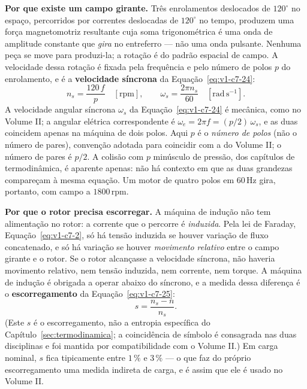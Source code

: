 \documentclass[12pt,a4paper]{article}
\numberwithin{equation}{section}
\numberwithin{table}{section}
\numberwithin{figure}{section}
\begin{document}
\textbf{Por que existe um campo girante.} Três enrolamentos deslocados de
$120^{\circ}$ no espaço, percorridos por correntes deslocadas de $120^{\circ}$
no tempo, produzem uma força magnetomotriz resultante cuja soma trigonométrica
é uma onda de amplitude constante que \emph{gira} no entreferro --- não uma
onda pulsante. Nenhuma peça se move para produzi-la; a rotação é do padrão
espacial de campo. A velocidade dessa rotação é fixada pela frequência e pelo
número de polos $p$ do enrolamento, e é a \textbf{velocidade síncrona} da
Equação~\eqref{eq:v1-c7-24}:
\begin{equation}\label{eq:v1-c7-24}
n_s = \frac{120\,f}{p} \quad [\mathrm{rpm}],
\qquad
\omega_s = \frac{2\pi n_s}{60} \quad [\mathrm{rad\,s^{-1}}] .
\end{equation}
A velocidade angular síncrona $\omega_s$ da Equação~\eqref{eq:v1-c7-24} é
mecânica, como no Volume II; a angular elétrica correspondente é
$\omega_e = 2\pi f = (p/2)\,\omega_s$, e as duas coincidem apenas na máquina de
dois polos. Aqui $p$ é o \emph{número de polos} (não o número de pares), convenção adotada
para coincidir com a do Volume II; o número de pares é $p/2$. A colisão com $p$
minúsculo de pressão, dos capítulos de termodinâmica, é aparente apenas: não há
contexto em que as duas grandezas compareçam à mesma equação. Um motor de
quatro polos em $60\,$Hz gira, portanto, com campo a $1800\,$rpm.

\textbf{Por que o rotor precisa escorregar.} A máquina de indução não tem
alimentação no rotor: a corrente que o percorre é \emph{induzida}. Pela lei de
Faraday, Equação~\eqref{eq:v1-c7-2}, só há tensão induzida se houver variação
de fluxo concatenado, e só há variação se houver \emph{movimento relativo}
entre o campo girante e o rotor. Se o rotor alcançasse a velocidade síncrona,
não haveria movimento relativo, nem tensão induzida, nem corrente, nem torque.
A máquina de indução é obrigada a operar abaixo do síncrono, e a medida dessa
diferença é o \textbf{escorregamento} da Equação~\eqref{eq:v1-c7-25}:
\begin{equation}\label{eq:v1-c7-25}
s = \frac{n_s - n}{n_s} .
\end{equation}
(Este $s$ é o escorregamento, não a entropia específica do
Capítulo~\ref{sec:termodinamica}; a coincidência de símbolo é consagrada nas
duas disciplinas e foi mantida por compatibilidade com o Volume II.) Em carga
nominal, $s$ fica tipicamente entre $1\,\%$ e $3\,\%$ --- o que faz do próprio
escorregamento uma medida indireta de carga, e é assim que ele é usado no
Volume II.
\end{document}
